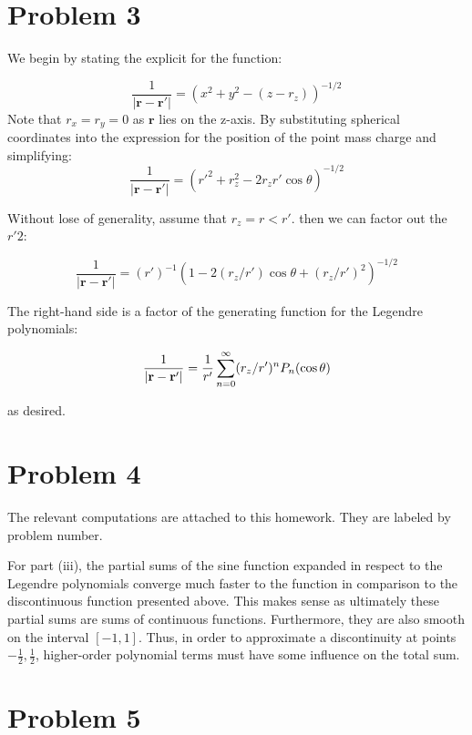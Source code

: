 \documentclass[12pt]{article}%
\begin{document}
\newcommand{\boldr}{\textbf{r}}
\newcommand{\boldrp}{\textbf{r'}}

\section*{Problem 3}

We begin by stating the explicit for the function:

\[ \frac{1}{|\boldr - \boldr'|} = (x^2 + y^2 - (z - r_z))^{-1/2} \]
Note that $r_x = r_y = 0$ as $\boldr$ lies on the z-axis. By substituting spherical coordinates into the expression for the position of the point mass charge and simplifying:
\[ \frac{1}{|\boldr - \boldr'|}  = (r'^2 + r_z^2 - 2r_zr'\cos{\theta})^{-1/2} \]

Without lose of generality, assume that $r_z = r < r'$. then we can factor out the $r'2$:

\[ \frac{1}{|\boldr - \boldr'|}  = (r')^{-1}(1 - 2(r_z/r')\cos{\theta} + (r_z/r')^2)^{-1/2} \]

The right-hand side is a factor of the generating function for the Legendre polynomials:

\[ \frac{1}{|\boldr - \boldr'|}  = \frac{1}{r'}\powaseries (r_z/r')^n P_n(\cos{\theta})\]

as desired.

\section*{Problem 4}
  The relevant computations are attached to this homework. They are labeled by problem number.

  For part (iii), the partial sums of the sine function expanded in respect to the Legendre polynomials converge much faster to the function in comparison to the discontinuous function presented above. This makes sense as ultimately these partial sums are sums of continuous functions. Furthermore, they are also smooth on the interval $[-1,1]$. Thus, in order to approximate a discontinuity at points $-\frac{1}{2},\frac{1}{2}$, higher-order polynomial terms must have some influence on the total sum.


\section*{Problem 5}
\end{document}
